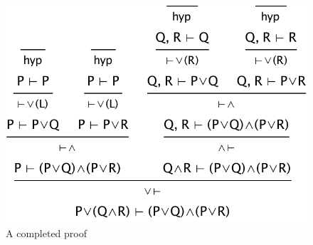 \documentclass[11pt]{article}
\renewcommand{\picscale}{0.6}
\begin{document}
\begin{figure}
\centering
\includegraphics[scale=\picscale]{pics/secondtree}
\caption{A completed proof}
\label{fig:secondtree}
\end{figure}
\end{document}
